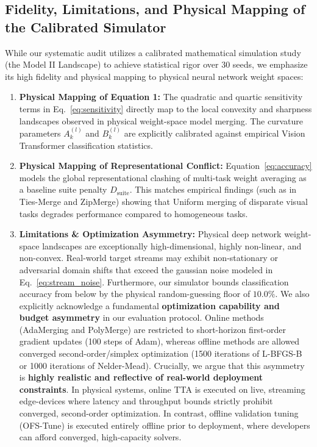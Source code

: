\subsection{Fidelity, Limitations, and Physical Mapping of the Calibrated Simulator}
\label{subsec:fidelity_mapping}
While our systematic audit utilizes a calibrated mathematical simulation study (the Model II Landscape) to achieve statistical rigor over 30 seeds, we emphasize its high fidelity and physical mapping to physical neural network weight spaces:
\begin{enumerate}
    \item \textbf{Physical Mapping of Equation 1:} The quadratic and quartic sensitivity terms in Eq.~\ref{eq:sensitivity} directly map to the local convexity and sharpness landscapes observed in physical weight-space model merging.
The curvature parameters $A_k^{(l)}$ and $B_k^{(l)}$ are explicitly calibrated against empirical Vision Transformer classification statistics.
    \item \textbf{Physical Mapping of Representational Conflict:} Equation~\ref{eq:accuracy} models the global representational clashing of multi-task weight averaging as a baseline suite penalty $D_{\text{suite}}$.
This matches empirical findings (such as in Ties-Merge and ZipMerge) showing that Uniform merging of disparate visual tasks degrades performance compared to homogeneous tasks.
    \item \textbf{Limitations \& Optimization Asymmetry:} Physical deep network weight-space landscapes are exceptionally high-dimensional, highly non-linear, and non-convex.
Real-world target streams may exhibit non-stationary or adversarial domain shifts that exceed the gaussian noise modeled in Eq.~\ref{eq:stream_noise}.
Furthermore, our simulator bounds classification accuracy from below by the physical random-guessing floor of $10.0\%$.
We also explicitly acknowledge a fundamental \textbf{optimization capability and budget asymmetry} in our evaluation protocol.
Online methods (AdaMerging and PolyMerge) are restricted to short-horizon first-order gradient updates (100 steps of Adam), whereas offline methods are allowed converged second-order/simplex optimization (1500 iterations of L-BFGS-B or 1000 iterations of Nelder-Mead).
Crucially, we argue that this asymmetry is \textbf{highly realistic and reflective of real-world deployment constraints}.
In physical systems, online TTA is executed on live, streaming edge-devices where latency and throughput bounds strictly prohibit converged, second-order optimization.
In contrast, offline validation tuning (OFS-Tune) is executed entirely offline prior to deployment, where developers can afford converged, high-capacity solvers.

\end{enumerate}
